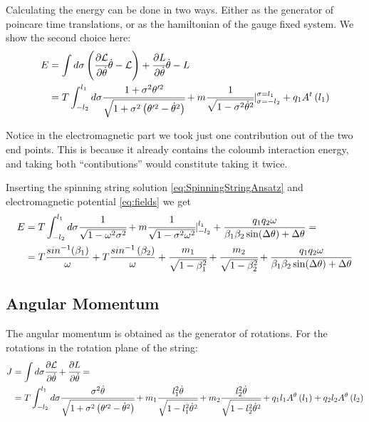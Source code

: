 \documentclass[11pt,a4paper]{article}
\begin{document}
 Calculating the energy can be done in two ways. Either as the generator of poincare time translations, or as the hamiltonian of the gauge fixed system. We show the second choice here:
\begin{align*}
E&=\int d\sigma\left(\cfrac{\partial\mathcal{L}}{\partial\dot{\theta}}\dot{\theta}-\mathcal{L}\right)+\cfrac{\partial L}{\partial\dot{\theta}}\dot{\theta}-L \\
&=T\int_{-l_{2}}^{l_{1}}d\sigma\cfrac{1+\sigma^{2}\theta'^{2}}{\sqrt{1+\sigma^{2}\left(\theta'^{2}-\dot{\theta}^{2}\right)}}+m\cfrac{1}{\sqrt{1-\sigma^{2}\dot{\theta}^{2}}}|_{\sigma=-l_{2}}^{\sigma=l_{1}}+q_{1}A^{t}\left(l_{1}\right)
\end{align*} 

Notice in the electromagnetic part we took just one contribution out of the two end points. This is because it already contains the coloumb interaction energy, and taking both “contibutions” would constitute taking it twice.

Inserting the spinning string solution \ref{eq:SpinningStringAnsatz} and electromagnetic potential \ref{eq:fields} we get
\begin{align}
E&=T\int_{-l_{2}}^{l_{1}}d\sigma\cfrac{1}{\sqrt{1-\omega^{2}\sigma^{2}}}+m\cfrac{1}{\sqrt{1-\sigma^{2}\omega^{2}}}|_{-l_{2}}^{l_{1}}+\frac{q_{1}q_{2}\omega}{\beta_{1}\beta_{2}\sin(\Delta\theta)+\Delta\theta}=\notag\\
&=T\frac{sin^{-1}(\beta_{1})}{\omega}+T\frac{sin^{-1}\left(\beta_{2}\right)}{\omega}+\cfrac{m_{1}}{\sqrt{1-\beta_{1}^{2}}}+\cfrac{m_{2}}{\sqrt{1-\beta_{2}^{2}}}+\frac{q_{1}q_{2}\omega}{\beta_{1}\beta_{2}\sin(\Delta\theta)+\Delta\theta}
\end{align} 
\FloatBarrier
 \subsection{Angular Momentum}
 
 The angular momentum is obtained as the generator of rotations. For the rotations in the rotation plane of the string:
\begin{align*}
J&=\int d\sigma\cfrac{\partial\mathcal{L}}{\partial\dot{\theta}}+\cfrac{\partial L}{\partial\dot{\theta}}=\\
&=T\int_{-l_{2}}^{l_{1}}d\sigma\cfrac{\sigma^{2}\dot{\theta}}{\sqrt{1+\sigma^{2}\left(\theta'^{2}-\dot{\theta}^{2}\right)}}+m_{1}\cfrac{l_{1}^{2}\dot{\theta}}{\sqrt{1-l_{1}^{2}\dot{\theta}^{2}}}+m_{2}\cfrac{l_{2}^{2}\dot{\theta}}{\sqrt{1-l_{2}^{2}\dot{\theta}^{2}}}+q_{1}l_{1}A^{\theta}\left(l_{1}\right)+q_{2}l_{2}A^{\theta}\left(l_{2}\right)
\end{align*} 
\end{document}
